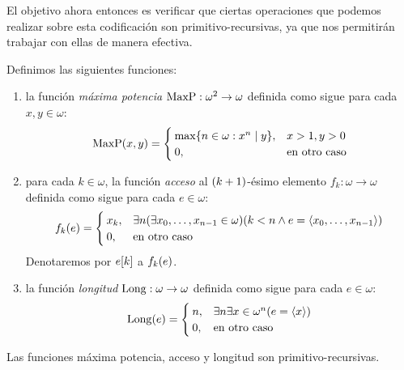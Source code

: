 El objetivo ahora entonces es verificar que ciertas operaciones que podemos realizar sobre esta codificación son primitivo-recursivas, ya que nos permitirán trabajar con ellas de manera efectiva.

\begin{definition}
	Definimos las siguientes funciones:

	\begin{enumerate}
		\item la función \emph{máxima potencia} $\MAXPOTENCIA:\omega^{2}\to\omega$ definida como sigue para cada $x, y\in\omega$:
		\[
			\MAXPOTENCIA\pa*{x, y} =
			\begin{cases}
				\max\set*{n\in\omega: x^{n}\mid y}, & x > 1, y > 0\\
				0, &\text{en otro caso}
			\end{cases}
		\]
		\item para cada $k\in\omega$, la función \emph{acceso} al $\pa*{k + 1}$-ésimo elemento $f_{k}:\omega\to\omega$ definida como sigue para cada $e\in\omega$:
		\[
			f_{k}\pa*{e} =
			\begin{cases}
				x_{k}, &\exists n\pa*{\exists x_{0},\dotsc, x_{n - 1}\in\omega}\pa*{k < n\land e =\inner*{x_{0},\dotsc, x_{n - 1}}}\\
				0, &\text{en otro caso}
			\end{cases}
		\]
		Denotaremos por $e\bra*{k}$ a $f_{k}\pa*{e}$.
		\item la función \emph{longitud} $\LONGITUD:\omega\to\omega$ definida como sigue para cada $e\in\omega$:
		\[
			\LONGITUD\pa*{e} =
			\begin{cases}
				n, &\exists n\exists x\in\omega^{n}\pa*{e =\inner*{x}}\\
				0, &\text{en otro caso}
			\end{cases}
		\]
	\end{enumerate}
\end{definition}

\begin{theorem}
	\label{theo: acceso_longitud_primitivas} %
	Las funciones máxima potencia, acceso y longitud son primitivo-recursivas.
\end{theorem}

